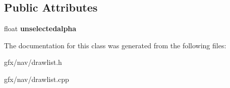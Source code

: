 \subsection*{Public Attributes}
\begin{DoxyCompactItemize}
\item 
float {\bfseries unselectedalpha}\hypertarget{classnavdrawlist_a666f66926cc4aaaffbfdb851791d0e97}{}\label{classnavdrawlist_a666f66926cc4aaaffbfdb851791d0e97}

\end{DoxyCompactItemize}


The documentation for this class was generated from the following files\+:\begin{DoxyCompactItemize}
\item 
gfx/nav/drawlist.\+h\item 
gfx/nav/drawlist.\+cpp\end{DoxyCompactItemize}
